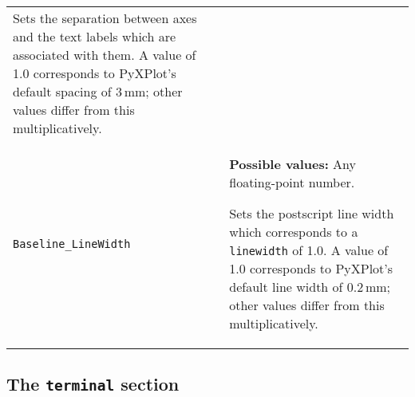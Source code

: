 \begin{longtable}{p{3.4cm}p{9cm}}
               Sets the separation between axes and the text labels which are associated with them. A value of 1.0 corresponds to PyXPlot's default spacing of $3\,\mathrm{mm}$; other values differ from this multiplicatively.
               \\
{\tt Baseline\_LineWidth} & {\bf Possible values:} Any floating-point number.

               Sets the postscript line width which corresponds to a {\tt linewidth} of 1.0. A value of 1.0 corresponds to PyXPlot's default line width of $0.2\,\mathrm{mm}$; other values differ from this multiplicatively.
               \\
\end{longtable}

\subsection{The {\tt terminal} section}
\label{sec:configfile_terminal}

